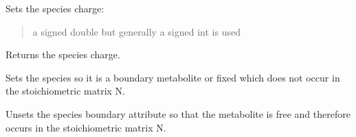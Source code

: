 \documentclass[letterpaper,12pt,english]{sphinxmanual}
\begin{document}
\begin{fulllineitems}
\begin{fulllineitems}
\label{\detokenize{api/core:cbmpy.CBModel.Species.setCharge}}
\pysigstartsignatures
\pysiglinewithargsret
{}
{}
{}
\pysigstopsignatures
\sphinxAtStartPar
Sets the species charge:
\begin{quote}\begin{description}
\sphinxAtStartPar
{} \textendash{} a signed double but generally a signed int is used

\end{description}\end{quote}

\end{fulllineitems}


\begin{fulllineitems}
\label{\detokenize{api/core:cbmpy.CBModel.Species.getCharge}}
\pysigstartsignatures
\pysiglinewithargsret
{}
{}
{}
\pysigstopsignatures
\sphinxAtStartPar
Returns the species charge.

\end{fulllineitems}


\begin{fulllineitems}
\label{\detokenize{api/core:cbmpy.CBModel.Species.setBoundary}}
\pysigstartsignatures
\pysiglinewithargsret
{}
{}
{}
\pysigstopsignatures
\sphinxAtStartPar
Sets the species so it is a boundary metabolite or fixed which does not occur
in the stoichiometric matrix N.

\end{fulllineitems}


\begin{fulllineitems}
\label{\detokenize{api/core:cbmpy.CBModel.Species.unsetBoundary}}
\pysigstartsignatures
\pysiglinewithargsret
{}
{}
{}
\pysigstopsignatures
\sphinxAtStartPar
Unsets the species boundary attribute so that the metabolite is free and
therefore occurs in the stoichiometric matrix N.

\end{fulllineitems}


\end{fulllineitems}
\end{document}
